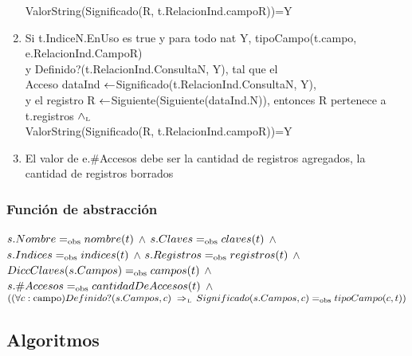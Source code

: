 \begin{enumerate}
 ValorString(Significado(R, t.RelacionInd.campoR))=Y
\item Si t.IndiceN.EnUso es true y para todo nat Y, tipoCampo(t.campo, e.RelacionInd.CampoR) \\y Definido?(t.RelacionInd.ConsultaN, Y), tal que el\\
 Acceso dataInd $\leftarrow$Significado(t.RelacionInd.ConsultaN, Y), \\
 y el registro R $\leftarrow$Siguiente(Siguiente(dataInd.N)), entonces R pertenece a t.registros $\land_{\mathrm{\scriptscriptstyle{L}}}$ \\
 ValorString(Significado(R, t.RelacionInd.campoR))=Y

\item El valor de e.\#Accesos debe ser la cantidad de registros agregados, la cantidad de registros borrados
\end{enumerate}

\subsubsection*{Función de abstracción}
$s.Nombre =_{\mathrm{obs}} nombre(t)$ $\land$ $s.Claves =_{\mathrm{obs}} claves(t)$ $\land$ \\
$s.Indices =_{\mathrm{obs}} indices(t)$ $\land$ 
$s.Registros =_{\mathrm{obs}} registros(t)$ $\land$ 
$DiccClaves(s.Campos) =_{\mathrm{obs}} campos(t)$ $\land$ 
$s.\#Accesos =_{\mathrm{obs}} cantidadDeAccesos(t)$ $\land$ \\
$((\paratodo{campo}{c}) Definido?(s.Campos, c) \impluego Significado(s.Campos, c) \igobs tipoCampo(c, t))$ \\
%
\newpage

\subsection{Algoritmos}




